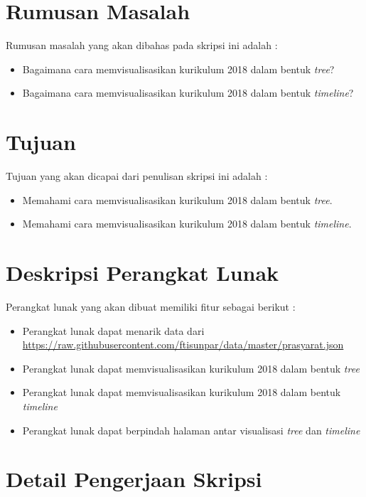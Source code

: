 \documentclass[a4paper,twoside]{article}
\begin{document}
\section{Rumusan Masalah}
Rumusan masalah yang akan dibahas pada skripsi ini adalah : 
\begin{itemize}
    \item Bagaimana cara memvisualisasikan kurikulum 2018 dalam bentuk \textit{tree}?
    \item Bagaimana cara memvisualisasikan kurikulum 2018 dalam bentuk \textit{timeline}?
\end{itemize}


\section{Tujuan}
Tujuan yang akan dicapai dari penulisan skripsi ini adalah : 
\begin{itemize}
    \item Memahami cara memvisualisasikan kurikulum 2018 dalam bentuk \textit{tree}.
    \item Memahami cara memvisualisasikan kurikulum 2018 dalam bentuk \textit{timeline}.
\end{itemize}

\section{Deskripsi Perangkat Lunak}

Perangkat lunak yang akan dibuat memiliki fitur sebagai berikut :
\begin{itemize}
    \item Perangkat lunak dapat menarik data dari \url{https://raw.githubusercontent.com/ftisunpar/data/master/prasyarat.json}
    \item Perangkat lunak dapat memvisualisasikan kurikulum 2018 dalam bentuk \textit{tree}
    \item Perangkat lunak dapat memvisualisasikan kurikulum 2018 dalam bentuk \textit{timeline}
    \item Perangkat lunak dapat berpindah halaman antar visualisasi \textit{tree} dan \textit{timeline}
\end{itemize}

\section{Detail Pengerjaan Skripsi}
\end{document}
